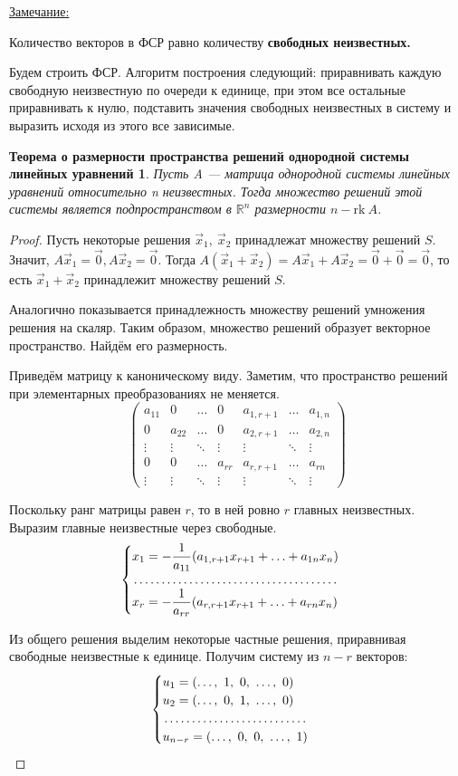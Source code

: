 \documentclass[a4paper,12pt]{article}
\newcommand{\rk}{\mathrm{rk}\:}
\newtheorem*{solutions}{Теорема о размерности пространства решений однородной системы линейных уравнений}
\newcommand{\note}{\underline{Замечание:} }
\newcommand{\R}{\mathbb{R}}
\begin{document}
	\note{Количество векторов в ФСР равно количеству \textbf{свободных неизвестных.}
	
	Будем строить ФСР. Алгоритм построения следующий: приравнивать каждую свободную неизвестную по очереди к единице, при этом все остальные приравнивать к нулю, подставить значения свободных неизвестных в систему и выразить исходя из этого все зависимые.
	
	\begin{solutions}
		Пусть A --- матрица однородной системы линейных уравнений относительно n неизвестных. Тогда множество решений этой системы является подпространством в $\R^n$ размерности $n - \rk A$.
	\end{solutions}
	\begin{proof}
		Пусть некоторые решения $\vec x_1,\ \vec x_2$ принадлежат множеству решений $S$. Значит, $A\vec x_1 = \vec{0}, A\vec x_2 = \vec 0$. Тогда $A(\vec x_1 + \vec x_2) = A\vec x_1 + A\vec x_2 = \vec 0 + \vec 0 = \vec 0$, то есть $\vec x_1 + \vec x_2$ принадлежит множеству решений $S$.
		
		Аналогично показывается принадлежность множеству решений умножения решения на скаляр. Таким образом, множество решений образует векторное пространство. Найдём его размерность.
		
		Приведём матрицу к каноническому виду. Заметим, что пространство решений при элементарных преобразованиях не меняется.
		\[\begin{pmatrix}a_{11} & 0 & \ldots & 0 & a_{1,r+1} & \ldots & a_{1,n} \\ 0 & a_{22} & \ldots & 0 & a_{2,r+1} & \ldots & a_{2,n} \\ \vdots & \vdots & \ddots & \vdots & \vdots & \ddots & \vdots \\ 0 & 0 & \ldots & a_{rr} & a_{r,r+1} & \ldots & a_{rn} \\ \vdots & \vdots & \ddots & \vdots & \vdots & \ddots & \vdots \end{pmatrix}\]
		
		Поскольку ранг матрицы равен  $r$, то в ней ровно $r$ главных неизвестных. Выразим главные неизвестные через свободные.
		\[\begin{cases} x_1 = -\displaystyle\frac{1}{a_{11}}(a_{1,r+1}x_{r+1} + \ldots + a_{1n}x_n) \\
		\dotfill \\
		x_r = -\displaystyle\frac{1}{a_{rr}}(a_{r,r+1}x_{r+1} + \ldots + a_{rn}x_n)\end{cases}\]
		
		Из общего решения выделим некоторые частные решения, приравнивая свободные неизвестные к единице. Получим систему из $n-r$ векторов:
		\[\begin{cases}u_1 = (\ldots,\ 1,\ 0,\ \ldots ,\ 0) \\
		u_2 = (\ldots,\ 0,\ 1,\ \ldots ,\ 0) \\
		\dotfill \\
		u_{n-r} = (\ldots,\ 0,\ 0,\ \ldots ,\ 1) \end{cases}\]
		

\end{proof}}
\end{document}

